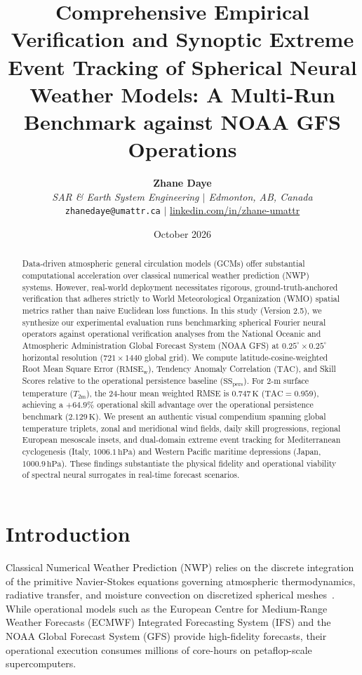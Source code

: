 \documentclass[10pt,twocolumn,letterpaper]{article}
\title{\textbf{Comprehensive Empirical Verification and Synoptic Extreme Event Tracking of Spherical Neural Weather Models: A Multi-Run Benchmark against NOAA GFS Operations}}
\author{
    \textbf{Zhane Daye} \\
    \textit{SAR \& Earth System Engineering $|$ Edmonton, AB, Canada} \\
    \texttt{zhanedaye@umattr.ca} \quad $|$ \quad \href{https://www.linkedin.com/in/zhane-umattr}{linkedin.com/in/zhane-umattr}
}
\date{October 2026}
\begin{document}
\maketitle

\begin{abstract}
Data-driven atmospheric general circulation models (GCMs) offer substantial computational acceleration over classical numerical weather prediction (NWP) systems. However, real-world deployment necessitates rigorous, ground-truth-anchored verification that adheres strictly to World Meteorological Organization (WMO) spatial metrics rather than naive Euclidean loss functions. In this study (Version 2.5), we synthesize our experimental evaluation runs benchmarking spherical Fourier neural operators against operational verification analyses from the National Oceanic and Atmospheric Administration Global Forecast System (NOAA GFS) at $0.25^\circ \times 0.25^\circ$ horizontal resolution ($721 \times 1440$ global grid). We compute latitude-cosine-weighted Root Mean Square Error ($\mathrm{RMSE}_\mathrm{w}$), Tendency Anomaly Correlation ($\mathrm{TAC}$), and Skill Scores relative to the operational persistence baseline ($\mathrm{SS}_\mathrm{pers}$). For $2\text{-}\si{\meter}$ surface temperature ($T_\mathrm{2m}$), the 24-hour mean weighted RMSE is $0.747\,\si{\kelvin}$ ($\mathrm{TAC} = 0.959$), achieving a $+64.9\%$ operational skill advantage over the operational persistence benchmark ($2.129\,\si{\kelvin}$). We present an authentic visual compendium spanning global temperature triplets, zonal and meridional wind fields, daily skill progressions, regional European mesoscale insets, and dual-domain extreme event tracking for Mediterranean cyclogenesis (Italy, $1006.1\,\text{hPa}$) and Western Pacific maritime depressions (Japan, $1000.9\,\text{hPa}$). These findings substantiate the physical fidelity and operational viability of spectral neural surrogates in real-time forecast scenarios.
\end{abstract}

\section{Introduction}
Classical Numerical Weather Prediction (NWP) relies on the discrete integration of the primitive Navier-Stokes equations governing atmospheric thermodynamics, radiative transfer, and moisture convection on discretized spherical meshes~\cite{bauer2015quiet}. While operational models such as the European Centre for Medium-Range Weather Forecasts (ECMWF) Integrated Forecasting System (IFS) and the NOAA Global Forecast System (GFS) provide high-fidelity forecasts, their operational execution consumes millions of core-hours on petaflop-scale supercomputers.
\end{document}
